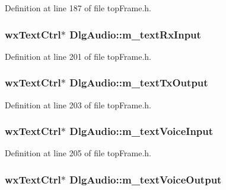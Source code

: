 Definition at line 187 of file top\-Frame.\-h.

\hypertarget{class_dlg_audio_a159d6689a03be5cd0f7fef25bba965fc}{
\subsubsection[{m\-\_\-text\-Rx\-Input}]{\setlength{\rightskip}{0pt plus 5cm}wx\-Text\-Ctrl$\ast$ Dlg\-Audio\-::m\-\_\-text\-Rx\-Input\hspace{0.3cm}{\ttfamily [protected]}}}\label{class_dlg_audio_a159d6689a03be5cd0f7fef25bba965fc}


Definition at line 201 of file top\-Frame.\-h.

\hypertarget{class_dlg_audio_a9a7b73374404fee2e3ce1b742ce5e563}{
\subsubsection[{m\-\_\-text\-Tx\-Output}]{\setlength{\rightskip}{0pt plus 5cm}wx\-Text\-Ctrl$\ast$ Dlg\-Audio\-::m\-\_\-text\-Tx\-Output\hspace{0.3cm}{\ttfamily [protected]}}}\label{class_dlg_audio_a9a7b73374404fee2e3ce1b742ce5e563}


Definition at line 203 of file top\-Frame.\-h.

\hypertarget{class_dlg_audio_a900d174fd432c0e70d6f3fccd24e723b}{
\subsubsection[{m\-\_\-text\-Voice\-Input}]{\setlength{\rightskip}{0pt plus 5cm}wx\-Text\-Ctrl$\ast$ Dlg\-Audio\-::m\-\_\-text\-Voice\-Input\hspace{0.3cm}{\ttfamily [protected]}}}\label{class_dlg_audio_a900d174fd432c0e70d6f3fccd24e723b}


Definition at line 205 of file top\-Frame.\-h.

\hypertarget{class_dlg_audio_a24ed8e4513996b1d938fbc6977d883a4}{
\subsubsection[{m\-\_\-text\-Voice\-Output}]{\setlength{\rightskip}{0pt plus 5cm}wx\-Text\-Ctrl$\ast$ Dlg\-Audio\-::m\-\_\-text\-Voice\-Output\hspace{0.3cm}{\ttfamily [protected]}}}\label{class_dlg_audio_a24ed8e4513996b1d938fbc6977d883a4}


